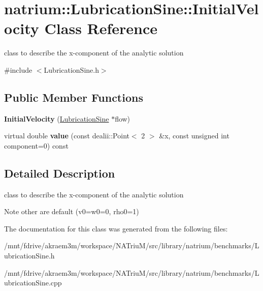 \hypertarget{classnatrium_1_1LubricationSine_1_1InitialVelocity}{
\section{natrium::LubricationSine::InitialVelocity Class Reference}
\label{classnatrium_1_1LubricationSine_1_1InitialVelocity}
}


class to describe the x-\/component of the analytic solution  


{\ttfamily \#include $<$LubricationSine.h$>$}\subsection*{Public Member Functions}
\begin{DoxyCompactItemize}
\item 
\hypertarget{classnatrium_1_1LubricationSine_1_1InitialVelocity_a6d8b3e835824af8880a4328482171ecf}{
{\bfseries InitialVelocity} (\hyperlink{classnatrium_1_1LubricationSine}{LubricationSine} $\ast$flow)}
\label{classnatrium_1_1LubricationSine_1_1InitialVelocity_a6d8b3e835824af8880a4328482171ecf}

\item 
\hypertarget{classnatrium_1_1LubricationSine_1_1InitialVelocity_ab482709cde5010d3d562608e2fb30706}{
virtual double {\bfseries value} (const dealii::Point$<$ 2 $>$ \&x, const unsigned int component=0) const }
\label{classnatrium_1_1LubricationSine_1_1InitialVelocity_ab482709cde5010d3d562608e2fb30706}

\end{DoxyCompactItemize}


\subsection{Detailed Description}
class to describe the x-\/component of the analytic solution \begin{DoxyNote}{Note}
other are default (v0=w0=0, rho0=1) 
\end{DoxyNote}


The documentation for this class was generated from the following files:\begin{DoxyCompactItemize}
\item 
/mnt/fdrive/akraem3m/workspace/NATriuM/src/library/natrium/benchmarks/LubricationSine.h\item 
/mnt/fdrive/akraem3m/workspace/NATriuM/src/library/natrium/benchmarks/LubricationSine.cpp\end{DoxyCompactItemize}
